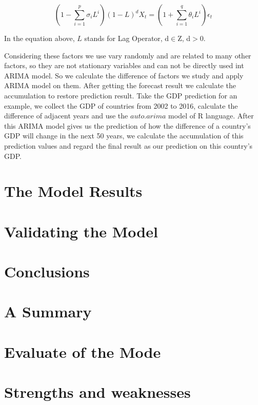 \documentclass{mcmthesis}
\begin{document}
  \begin{equation}
    \left(1-\sum^p_{i=1}\sigma_i L^i\right)(1-L)^d X_t = \left(1+\sum^q_{i=1}\theta_i L^i\right)\epsilon_t
  \end{equation}

  \indent In the equation above, $L$ stands for Lag Operator, d$\in$Z, d$>$0.

  \indent Considering these factors we use vary randomly and are related to many other factors, so they are not stationary variables and can not be directly used int ARIMA model. So we calculate the difference of factors we study and apply ARIMA model on them. After getting the forecast result we calculate the accumulation to restore prediction result. Take the GDP prediction for an example, we collect the GDP of countries from 2002 to 2016, calculate the difference of adjacent years and use the $auto.arima$ model of R language. After this ARIMA model gives us the prediction of how the difference of a country's GDP will change in the next 50 years, we calculate the accumulation of this prediction values and regard the final result as our prediction on this country's GDP.

\section{The Model Results}

\section{Validating the Model}

\section{Conclusions}

\section{A Summary}

\section{Evaluate of the Mode}

\section{Strengths and weaknesses}
\end{document}
